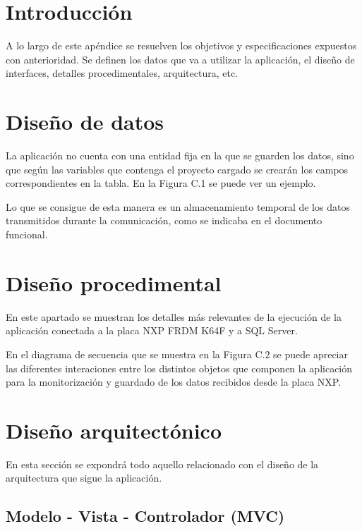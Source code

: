 
\section{Introducción}

A lo largo de este apéndice se resuelven los objetivos y especificaciones expuestos con anterioridad. Se definen los datos que va a utilizar la aplicación, el diseño de interfaces, detalles procedimentales, arquitectura, etc.

\section{Diseño de datos}

La aplicación no cuenta con una entidad fija en la que se guarden los datos, sino que según las variables que contenga el proyecto cargado se crearán los campos correspondientes en la tabla. En la Figura C.1 se puede ver un ejemplo.


Lo que se consigue de esta manera es un almacenamiento temporal de los datos transmitidos durante la comunicación, como se indicaba en el documento funcional.

\section{Diseño procedimental}

En este apartado se muestran los detalles más relevantes de la ejecución de la aplicación conectada a la placa NXP FRDM K64F y a SQL Server.

En el diagrama de secuencia que se muestra en la Figura C.2 se puede apreciar las diferentes interaciones entre los distintos objetos que componen la aplicación para la monitorización y guardado de los datos recibidos desde la placa NXP.


\section{Diseño arquitectónico}

En esta sección se expondrá todo aquello relacionado con el diseño de la arquitectura que sigue la aplicación.

\subsection{Modelo - Vista - Controlador (MVC)}

